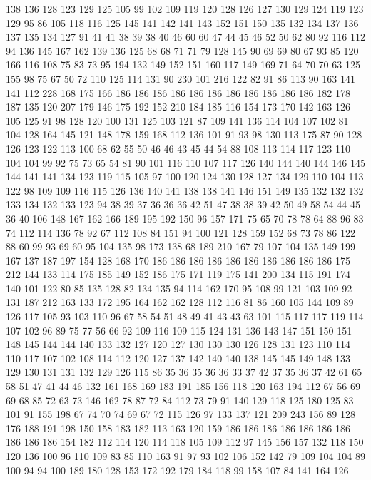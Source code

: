 138 136 128 123 129 125 105 99 102 109 119 120 128 126 127 130 129 124 119 123
129 95 86 105 118 116 125 145 141 142 141 143 152 151 150 135 132 134 137 136
137 135 134 127 91 41 41 38 39 38 40 46 60 60 47 44 45 46 52 50
62 80 92 116 112 94 136 145 167 162 139 136 125 68 68 71 71 79 128 145
90 69 69 80 67 93 85 120 166 116 108 75 83 73 95 194 132 149 152 151
160 117 149 169 71 64 70 70 63 125 155 98 75 67 50 72 110 125 114 131
90 230 101 216 122 82 91 86 113 90 163 141 141 112 228 168 175 166 186 186
186 186 186 186 186 186 186 186 186 182 178 187 135 120 207 179 146 175 192 152
210 184 185 116 154 173 170 142 163 126 105 125 91 98 128 120 100 131 125 103
121 87 109 141 136 114 104 107 102 81 104 128 164 145 121 148 178 159 168 112
136 101 91 93 98 130 113 175 87 90 128 126 123 122 113 100 68 62 55 50
46 46 43 45 44 54 88 108 113 114 117 123 110 104 104 99 92 75 73 65
54 81 90 101 116 110 107 117 126 140 144 140 144 146 145 144 141 141 134 123
119 115 105 97 100 120 124 130 128 127 134 129 110 104 113 122 98 109 109 116
115 126 136 140 141 138 138 141 146 151 149 135 132 132 132 133 134 132 133 123
94 38 39 37 36 36 36 42 51 47 38 38 39 42 50 49 58 54 44 45
36 40 106 148 167 162 166 189 195 192 150 96 157 171 75 65 70 78 78 64
88 96 83 74 112 114 136 78 92 67 112 108 84 151 94 100 121 128 159 152
68 73 78 86 122 88 60 99 93 69 60 95 104 135 98 173 138 68 189 210
167 79 107 104 135 149 199 167 137 187 197 154 128 168 170 186 186 186 186 186
186 186 186 186 186 175 212 144 133 114 175 185 149 152 186 175 171 119 175 141
200 134 115 191 174 140 101 122 80 85 135 128 82 134 135 94 114 162 170 95
108 99 121 103 109 92 131 187 212 163 133 172 195 164 162 162 128 112 116 81
86 160 105 144 109 89 126 117 105 93 103 110 96 67 58 54 51 48 49 41
43 43 63 101 115 117 117 119 114 107 102 96 89 75 77 56 66 92 109 116
109 115 124 131 136 143 147 151 150 151 148 145 144 144 140 133 132 127 120 127
130 130 130 126 128 131 123 110 114 110 117 107 102 108 114 112 120 127 137 142
140 140 138 145 145 149 148 133 129 130 131 131 132 129 126 115 86 35 36 35
36 36 33 37 42 37 35 36 37 42 61 65 58 51 47 41 44 46 132 161
168 169 183 191 185 156 118 120 163 194 112 67 56 69 69 68 85 72 63 73
146 162 78 87 72 84 112 73 79 91 140 129 118 125 180 125 83 101 91 155
198 67 74 70 74 69 67 72 115 126 97 133 137 121 209 243 156 89 128 176
188 191 198 150 158 183 182 113 163 120 159 186 186 186 186 186 186 186 186 186
186 154 182 112 114 120 114 118 105 109 112 97 145 156 157 132 118 150 120 136
100 96 110 109 83 85 110 163 91 97 93 102 106 152 142 79 109 104 104 89
100 94 94 100 189 180 128 153 172 192 179 184 118 99 158 107 84 141 164 126
